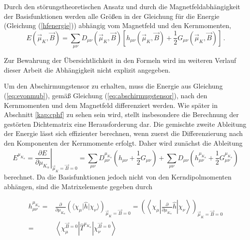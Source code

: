   	Durch den störungstheoretischen Ansatz und durch die Magnetfeldabhängigkeit der Basisfunktionen werden alle Größen in der Gleichung für die Energie (Gleichung (\ref{hfenergie})) abhängig vom Magnetfeld und den Kernmomenten, 
  	\begin{equation}\label{eq:evonmub}
  	  E(\vec{\mu}_K,\vec{B})=\sum_{\mu\nu}D_{\mu\nu}(\vec{\mu}_K,\vec{B})\left[h_{\mu\nu}(\vec{\mu}_K,\vec{B})+\frac{1}{2}G_{\mu\nu}(\vec{\mu}_K,\vec{B})\right]\, .
	\end{equation} 
	 	 
  	Zur Bewahrung der Übersichtlichkeit in den Formeln wird im weiteren Verlauf dieser Arbeit die Abhängigkeit nicht explizit angegeben.
  	
  	Um den Abschirmungstensor zu erhalten, muss die Energie aus Gleichung (\ref{eq:evonmub}), gemäß Gleichung (\ref{eq:abschirmugstensor}), nach den Kernmomenten und dem Magnetfeld differenziert werden. Wie später in Abschnitt \ref{kap:cphf} zu sehen sein wird, stellt insbesondere die Berechnung der gestörten Dichtematrix eine Herausforderung dar. Die gemischte zweite Ableitung der Energie lässt sich effizienter berechnen, wenn zuerst die Differenzierung nach den Komponenten der Kernmomente erfolgt.\supercite{baron1991} Daher wird zunächst die Ableitung  	
  	\begin{equation}\label{eq:enachmu}
  	  E^{\mu_{K_\alpha}}=\left.\frac{\partial E}{\partial\mu_{K_\alpha}}\right|_{\vec{\mu}_K=\vec{B}=0}=\sum_{\mu\nu}D_{\mu\nu}^{\mu_{K_\alpha}}\left(h_{\mu\nu}+\frac{1}{2}G_{\mu\nu}\right)+\sum_{\mu\nu}D_{\mu\nu}\left(h_{\mu\nu}^{\mu_{K_\alpha}}+\frac{1}{2}G_{\mu\nu}^{\mu_{K_\alpha}}\right)
  	\end{equation}
     berechnet. Da die Basisfunktionen jedoch nicht von den Kerndipolmomenten abhängen, sind die Matrixelemente gegeben durch
     
     \begin{equation}\label{eq:hmukelemente}
     \begin{aligned}
       h_{\mu\nu}^{\mu_{K_\alpha}}=&\frac{\partial}{\partial \mu_{K_\alpha}}\left(\langle\chi_\mu\vert\hat{h}\vert\chi_\nu\rangle\right)_{\vec{\mu}_K=\vec{B}=0}=\left(\left\langle\chi_\mu\left\vert\frac{\partial}{\partial \mu_{K_\alpha}}\hat{h}\right\vert\chi_\nu\right\rangle\right)_{\vec{\mu}_K=\vec{B}=0}\\
       =&\left\langle\chi_\mu^{\vec{B}=0}\left\vert\hat{T}^{\mu_{K_\alpha}}\right\vert\chi_\nu^{\vec{B}=0}\right\rangle
     \end{aligned}
     \end{equation}
     
